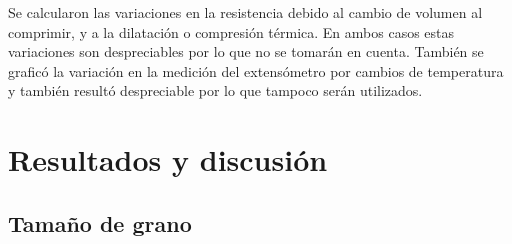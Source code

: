 \documentclass[a4paper,12pt,fleqn,twoside,openany]{book}
\begin{document}
Se calcularon las variaciones en la resistencia debido al cambio de volumen al comprimir, y a la dilatación o compresión térmica. En ambos casos estas 
variaciones son despreciables por lo que no se tomarán en cuenta. También se graficó la variación en la medición del extensómetro por cambios de 
temperatura y también resultó despreciable por lo que tampoco serán utilizados.







\chapter{Resultados y discusión}

\section{Tamaño de grano}
\end{document}
